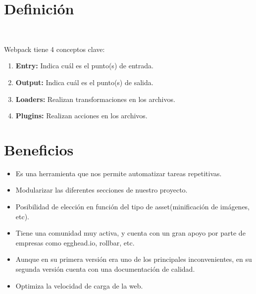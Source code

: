 \section{Definici\'on}


\\

\item Webpack tiene 4 conceptos clave:
\begin{enumerate}
    \item \textbf{Entry:} Indica cuál es el punto(s) de entrada.
    \item \textbf{Output:} Indica cuál es el punto(s) de salida.
    \item \textbf{Loaders:} Realizan transformaciones en los archivos.
    \item \textbf{Plugins:} Realizan acciones en los archivos.
\end{enumerate}

\section{Beneficios}
\begin{itemize}
    \item Es una herramienta que nos permite automatizar tareas repetitivas.
    \item Modularizar las diferentes secciones de nuestro proyecto.
    \item Posibilidad de elección en función del tipo de asset(minificación de imágenes, etc).
    \item Tiene una comunidad muy activa, y cuenta con un gran apoyo por parte de empresas como egghead.io, rollbar, etc.
    \item Aunque en su primera versión era uno de los principales inconvenientes, en su segunda versión cuenta con una documentación de calidad.
    \item Optimiza la velocidad de carga de la web.
\end{itemize}

